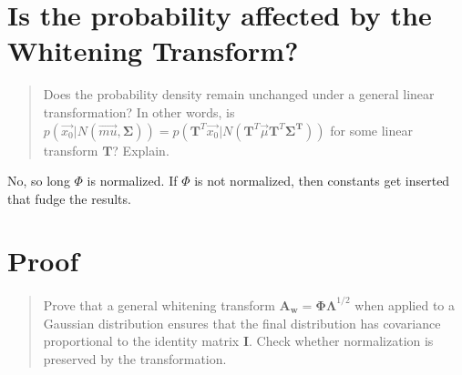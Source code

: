\documentclass[11pt]{article}
\begin{document}
\section{Is the probability affected by the Whitening Transform?}
\begin{quote}
Does the probability density remain unchanged under a general linear transformation?  In other words, is $p(\vec{x_0}|N(\vec{mu} , \mathbf{\Sigma})) = p(\mathbf{T}^T \vec{x_0} | N(\mathbf{T}^T \vec{\mu}\mathbf{T}^T \mathbf{\Sigma ^T} ))$ for some linear transform $\mathbf{T}$?  Explain.
\end{quote}
No, so long $\Phi$ is normalized.  If $\Phi$ is not normalized, then constants get inserted that fudge the results.  





\section{Proof}
\begin{quote}
Prove that a general whitening transform $\mathbf{A_w} = \mathbf{\Phi \Lambda}^{1/2} $ when applied to a Gaussian distribution ensures that the final distribution has covariance proportional to the identity matrix $\mathbf{I}$.  Check whether normalization is preserved by the transformation. 
\end{quote}






\end{document}
